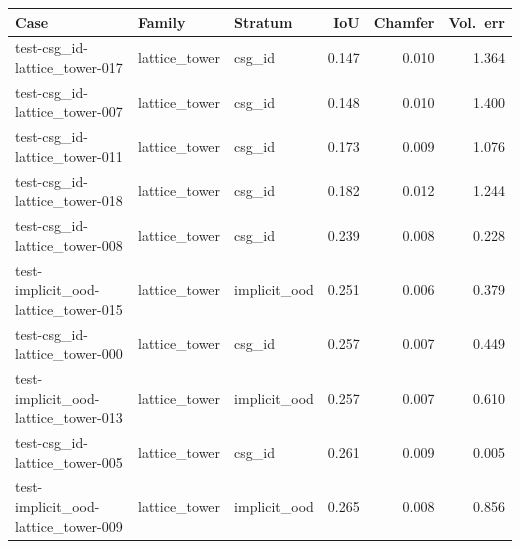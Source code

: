 \begin{tabular}{@{}lllrrr@{}}
\toprule
Case & Family & Stratum & IoU & Chamfer & Vol.\ err \\
\midrule
test-csg\_id-lattice\_tower-017 & lattice\_tower & csg\_id & 0.147 & 0.010 & 1.364 \\
test-csg\_id-lattice\_tower-007 & lattice\_tower & csg\_id & 0.148 & 0.010 & 1.400 \\
test-csg\_id-lattice\_tower-011 & lattice\_tower & csg\_id & 0.173 & 0.009 & 1.076 \\
test-csg\_id-lattice\_tower-018 & lattice\_tower & csg\_id & 0.182 & 0.012 & 1.244 \\
test-csg\_id-lattice\_tower-008 & lattice\_tower & csg\_id & 0.239 & 0.008 & 0.228 \\
test-implicit\_ood-lattice\_tower-015 & lattice\_tower & implicit\_ood & 0.251 & 0.006 & 0.379 \\
test-csg\_id-lattice\_tower-000 & lattice\_tower & csg\_id & 0.257 & 0.007 & 0.449 \\
test-implicit\_ood-lattice\_tower-013 & lattice\_tower & implicit\_ood & 0.257 & 0.007 & 0.610 \\
test-csg\_id-lattice\_tower-005 & lattice\_tower & csg\_id & 0.261 & 0.009 & 0.005 \\
test-implicit\_ood-lattice\_tower-009 & lattice\_tower & implicit\_ood & 0.265 & 0.008 & 0.856 \\
\bottomrule
\end{tabular}
